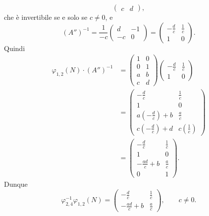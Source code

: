 \documentclass[a4paper]{article}
\begin{document}
\begin{snippetexample}{}
\[\begin{pmatrix}
            c & d
        \end{pmatrix},
    \]
    che è invertibile se e solo se \(c \neq 0\), e
    \[
        (A'')^{-1}
        =
        \frac{1}{-c}
        \begin{pmatrix}
            d & -1 \\
            -c & 0
        \end{pmatrix}
        =
        \begin{pmatrix}
            -\frac{d}{c} & \frac{1}{c} \\
            1 & 0
        \end{pmatrix}.
    \]
    Quindi
    \begin{align*}
        \varphi_{1,2}(N)\cdot (A'')^{-1}
        &=
        \begin{pmatrix}
            1 & 0 \\
            0 & 1 \\
            a & b \\
            c & d
        \end{pmatrix}
        \begin{pmatrix}
            -\frac{d}{c} & \frac{1}{c} \\
            1 & 0
        \end{pmatrix} \\
        &=
        \begin{pmatrix}
            -\frac{d}{c} & \frac{1}{c} \\
            1 & 0 \\
            a\left(-\frac{d}{c}\right) + b & \frac{a}{c} \\
            c\left(-\frac{d}{c}\right) + d & c\left(\frac{1}{c}\right)
        \end{pmatrix} \\
        &=
        \begin{pmatrix}
            -\frac{d}{c} & \frac{1}{c} \\
            1 & 0 \\
            -\frac{ad}{c} + b & \frac{a}{c} \\
            0 & 1
        \end{pmatrix}.
    \end{align*}
    Dunque
    \[
        \varphi_{2,4}^{-1}\varphi_{1,2}(N)
        =
        \begin{pmatrix}
            -\frac{d}{c} & \frac{1}{c} \\
            -\frac{ad}{c} + b & \frac{a}{c}
        \end{pmatrix},
        \qquad c \neq 0.
    \]
\end{snippetexample}
\end{document}
